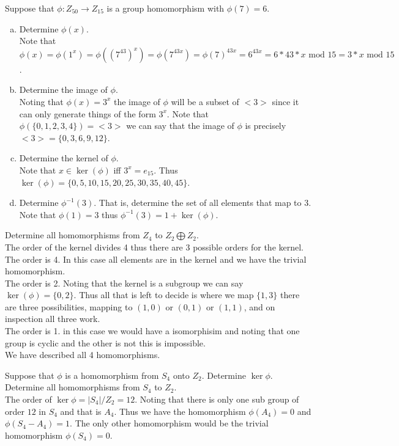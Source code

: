 \documentclass[12pt]{article}
\makeatletter
\theoremstyle{homework}
\newenvironment{exercise}[1]
{\def\@currentlabel{#1}\exercisecore}
{\endexercisecore}
\makeatother
\begin{document}
\begin{exercise}{10.24}
Suppose that $\phi: Z_{50} \rightarrow Z_{15}$ is a group homomorphism with $\phi(7) = 6$.\\
\begin{enumerate}[a.]
\item
Determine $\phi(x)$.\\
Note that $\phi(x)=\phi(1^x)=\phi((7^{43})^x)=\phi(7^{43x})=\phi(7)^{43x}=6^{43x}=6*43*x\text{ mod }15=3*x\text{ mod }15$.
\item
Determine the image of $\phi$.\\
Noting that $\phi(x)=3^x$ the image of $\phi$ will be a subset of $<3>$ since it can only generate things of the form $3^x$.  Note that $\phi(\{0,1,2,3,4\})=<3>$ we can say that the image of $\phi$ is precisely $<3>=\{0,3,6,9,12\}$.
\item
Determine the kernel of $\phi$.\\
Note that $x\in \ker(\phi)$ iff $3^x=e_{15}$.  Thus $\ker(\phi)=\{0,5,10,15,20,25,30,35,40,45\}$.
\item
Determine $\phi^{-1}(3)$. That is, determine the set of all elements that map to 3.\\
Note that $\phi(1)=3$ thus $\phi^{-1}(3)=1+\ker(\phi)$.
\end{enumerate}
\end{exercise}

\begin{exercise}{10.26}
Determine all homomorphisms from $Z_4$ to $Z_2 \bigoplus Z_2$.\\
The order of the kernel divides 4 thus there are 3 possible orders for the kernel.\\
The order is 4.  In this case all elements are in the kernel and we have the trivial homomorphism.\\
The order is 2.  Noting that the kernel is a subgroup we can say $\ker(\phi)=\{0,2\}$.  Thus all that is left to decide is where we map $\{1,3\}$ there are three possibilities, mapping to $(1,0)$ or $(0,1)$ or $(1,1)$, and on inspection all three work.\\
The order is 1.  in this case we would have a isomorphisim and noting that one group is cyclic and the other is not this is impossible.\\
We have described all 4 homomorphisms.
\end{exercise}

\begin{exercise}{10.28}
Suppose that $\phi$ is a homomorphism from $S_4$ onto $Z_2$. Determine $\ker \phi$. Determine all homomorphisms from $S_4$ to $Z_2$.\\
The order of $\ker \phi=|S_4|/Z_2=12$.  Noting that there is only one sub group of order $12$ in $S_4$ and that is $A_4$.  Thus we have the homomorphism $\phi(A_4)=0$ and $\phi(S_4-A_4)=1$.  The only other homomorphism would be the trivial homomorphism $\phi(S_4)=0$.
\end{exercise}
\end{document}
